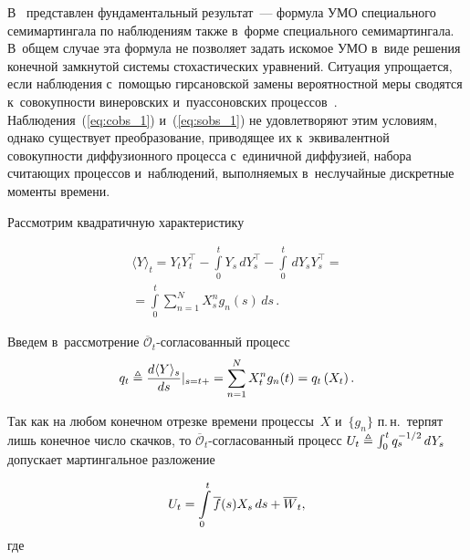 \begin{multicols}{2}
В~\cite{LSh_89} представлен фундаментальный результат~--- 
формула УМО специального семимартингала по наблюдениям также в~форме специального семимартингала. 
В~общем случае эта формула не позволяет задать искомое УМО в~виде решения конечной замкнутой системы 
стохастических уравнений. Ситуация упрощается, если наблюдения с~помощью гирсановской 
замены вероятностной меры сводятся к~совокупности винеровских и~пуассоновских процессов~\cite{WH_85, EAM_10}. 
Наблюдения~(\ref{eq:cobs_1}) и~(\ref{eq:sobs_1}) не удовлетворяют этим условиям, однако существует 
преобразование, приводящее их к~эквивалентной совокупности диффузионного процесса с~единичной диффузией, 
набора считающих процессов и~наблюдений, выполняемых в~неслучайные дискретные моменты времени.

Рассмотрим квадратичную характеристику

\vspace*{-4pt}

\noindent
\begin{multline*}
  \langle   Y
  \rangle_t = Y_tY_t^{\top} - \int\limits_0^t Y_s\,dY_s^{\top} -  \int\limits_0^t \,dY_sY_s^{\top} ={}\\
  {}=
  \int\limits_{0}^{t} \sum\limits_{n=1}^NX_{s}^ng_n(s) \,ds\,.
  \end{multline*}
  
  \vspace*{-4pt}

Введем в~рассмотрение $\overline{\mathcal{O}}_t$-со\-гла\-со\-ван\-ный процесс
\begin{equation}
q_t \triangleq \displaystyle\frac{\displaystyle d \langle   Y   \rangle_s\mathstrut}{\displaystyle ds\mathstrut}|_{s=t+} = \sum\limits_{n=1}^N X_{t}^n g_n(t)=q_t\left(X_t\right).
\label{eq:q_def}
\end{equation}

\vspace*{-2pt}

\noindent
Так как на любом конечном отрезке времени процессы~$X$ и~$\{g_n\}$ п.\,н.\
 терпят лишь конечное число скачков, то $\overline{\mathcal{O}}_t$-со\-гла\-со\-ван\-ный процесс
$U_t \hm \triangleq
\int\nolimits_0^t q_s^{-{1}/{2}}\,dY_s$
допускает мартингальное разложение

\vspace*{-2pt}

\noindent
$$
U_t =
\int\limits_0^t \overline{f}(s)X_s\,ds \hm+\overline{W}_t,
$$
где


\end{multicols}
